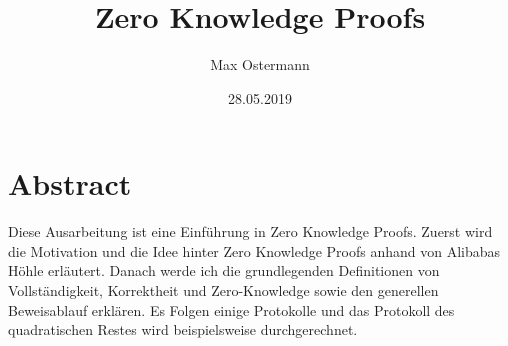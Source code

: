 \documentclass {article}
\title{Zero Knowledge Proofs}
\author{Max Ostermann}
\date{28.05.2019}
\begin{document}
\maketitle
{}
\newpage
{}

\section{Abstract}
Diese Ausarbeitung ist eine Einführung in Zero Knowledge Proofs.
Zuerst wird die Motivation und die Idee hinter Zero Knowledge Proofs anhand von Alibabas Höhle erläutert. Danach werde ich die grundlegenden Definitionen von Vollständigkeit, Korrektheit und Zero-Knowledge sowie den generellen Beweisablauf erklären.
Es Folgen einige Protokolle und das Protokoll des quadratischen Restes wird beispielsweise durchgerechnet.
\end{document}
